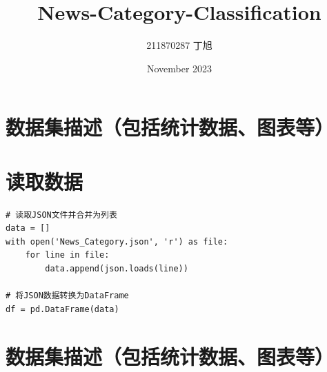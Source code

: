 \documentclass{article}
\title{News-Category-Classification}
\author{211870287 丁旭 }
\date{November 2023}
\begin{document}

\section{数据集描述（包括统计数据、图表等）}
\section{读取数据}
\begin{lstlisting}
# 读取JSON文件并合并为列表
data = []
with open('News_Category.json', 'r') as file:
    for line in file:
        data.append(json.loads(line))

# 将JSON数据转换为DataFrame
df = pd.DataFrame(data)
\end{lstlisting}


\section{数据集描述（包括统计数据、图表等）}
\end{document}
